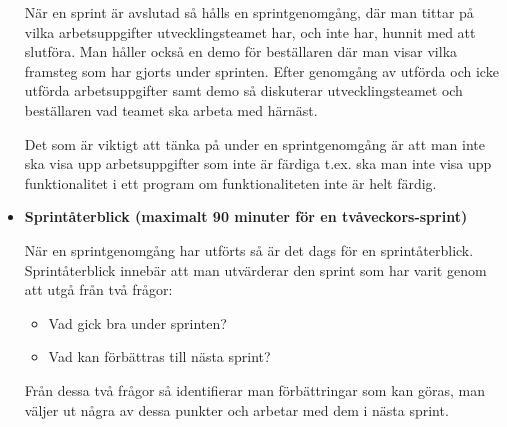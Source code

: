 \begin{itemize}
	När en sprint är avslutad så hålls en sprintgenomgång, där man tittar på vilka arbetsuppgifter utvecklingsteamet har, och inte har, hunnit med att slutföra. Man håller också en demo för beställaren där man visar vilka framsteg som har gjorts under sprinten. Efter genomgång av utförda och icke utförda arbetsuppgifter samt demo så diskuterar utvecklingsteamet och beställaren vad teamet ska arbeta med härnäst.
	 
Det som är viktigt att tänka på under en sprintgenomgång är att man inte ska visa upp arbetsuppgifter som inte är färdiga t.ex. ska man inte visa upp funktionalitet i ett program om funktionaliteten inte är helt färdig.

\item \textbf{Sprintåterblick (maximalt 90 minuter för en tvåveckors-sprint)}

När en sprintgenomgång har utförts så är det dags för en sprintåterblick. Sprintåterblick innebär att man utvärderar den sprint som har varit genom att utgå från två frågor:

\begin{itemize}
	\item Vad gick bra under sprinten?
	\item Vad kan förbättras till nästa sprint?
\end{itemize}

Från dessa två frågor så identifierar man förbättringar som kan göras, man väljer ut några av dessa punkter och arbetar med dem i nästa sprint.

\end{itemize}
